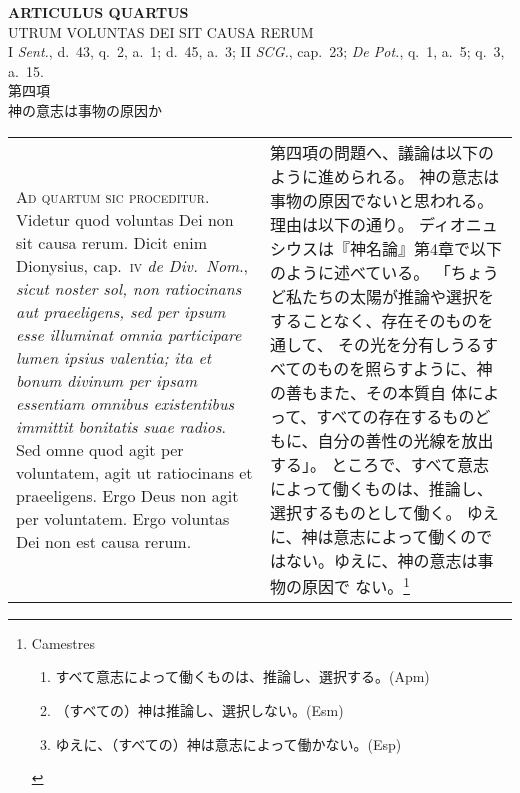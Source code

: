 \documentclass[10pt]{jsarticle} %
\begin{document}
\newpage




\begin{center}
 {\Large {\bf ARTICULUS QUARTUS}}\\
 {\large UTRUM VOLUNTAS DEI SIT CAUSA RERUM}\\
 {\footnotesize I {\itshape Sent.}, d.~43, q.~2, a.~1; d.~45, a.~3; II
 {\itshape SCG.}, cap.~23; {\itshape De Pot.}, q.~1, a.~5; q.~3, a.~15.}\\
 {\Large 第四項\\神の意志は事物の原因か}
\end{center}

\begin{longtable}{p{21em}p{21em}}


{\scshape {\huge A}d quartum sic proceditur}. Videtur quod
 voluntas Dei non sit causa rerum. Dicit enim Dionysius, cap.~{\scshape iv} {\itshape de
 Div.~Nom}., {\itshape sicut noster sol, non ratiocinans aut praeeligens, sed per
 ipsum esse illuminat omnia participare lumen ipsius valentia; ita et
 bonum divinum per ipsam essentiam omnibus existentibus immittit
 bonitatis suae radios}. Sed omne quod agit per voluntatem, agit ut
 ratiocinans et praeeligens. Ergo Deus non agit per voluntatem. Ergo
 voluntas Dei non est causa rerum.

 
&

 第四項の問題へ、議論は以下のように進められる。
 神の意志は事物の原因でないと思われる。理由は以下の通り。
 ディオニュシウスは『神名論』第4章で以下のように述べている。
 「ちょうど私たちの太陽が推論や選択をすることなく、存在そのものを通して、
 その光を分有しうるすべてのものを照らすように、神の善もまた、その本質自
 体によって、すべての存在するものどもに、自分の善性の光線を放出する」。
 ところで、すべて意志によって働くものは、推論し、選択するものとして働く。
 ゆえに、神は意志によって働くのではない。ゆえに、神の意志は事物の原因で
 ない。\footnote{Camestres\begin{enumerate}
		  \item すべて意志によって働くものは、推論し、選択する。(Apm)
		  \item （すべての）神は推論し、選択しない。(Esm)
		  \item ゆえに、（すべての）神は意志によって働かない。(Esp)
		 \end{enumerate}}
 


\\




\end{longtable}
\end{document}

